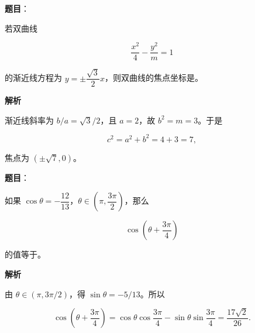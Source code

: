 \begin{answer}

\textbf{题目}：

若双曲线

\nopagebreak[4]
\[
\frac{x^2}{4}-\frac{y^2}{m}=1
\]

的渐近线方程为 $y=\pm\dfrac{\sqrt3}{2}x$，则双曲线的焦点坐标是\gkblank{}。

\textbf{解析}

渐近线斜率为 $b/a=\sqrt3/2$，且 $a=2$，故 $b^2=m=3$。于是

\nopagebreak[4]
\[
c^2=a^2+b^2=4+3=7,
\]

焦点为 $(\pm\sqrt7,0)$。


\end{answer}
\begin{answer}

\textbf{题目}：

如果 $\cos\theta=-\dfrac{12}{13}$，$\theta\in\left(\pi,\dfrac{3\pi}{2}\right)$，那么

\nopagebreak[4]
\[
\cos\left(\theta+\frac{3\pi}{4}\right)
\]

的值等于\gkblank{}。

\textbf{解析}

由 $\theta\in(\pi,3\pi/2)$，得 $\sin\theta=-5/13$。所以

\nopagebreak[4]
\[
\cos\left(\theta+\frac{3\pi}{4}\right)
=\cos\theta\cos\frac{3\pi}{4}
-\sin\theta\sin\frac{3\pi}{4}
=\frac{17\sqrt2}{26}.
\]


\end{answer}
